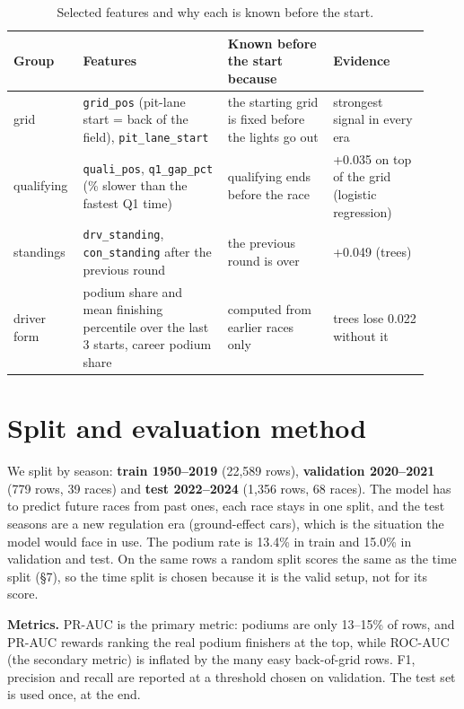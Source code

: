\documentclass[10pt,a4paper]{article}
\newcommand{\code}[1]{\texttt{#1}}
\begin{document}
\begin{table}[H]
\centering\small
\caption{Selected features and why each is known before the start.}
\begin{tabular}{>{\raggedright\arraybackslash}p{0.13\linewidth}>{\raggedright\arraybackslash}p{0.33\linewidth}>{\raggedright\arraybackslash}p{0.24\linewidth}>{\raggedright\arraybackslash}p{0.22\linewidth}}
\toprule
Group & Features & Known before the start because & Evidence \\
\midrule
grid & \code{grid\_pos} (pit-lane start = back of the field), \code{pit\_lane\_start} & the starting grid is fixed before the lights go out & strongest signal in every era \\
qualifying & \code{quali\_pos}, \code{q1\_gap\_pct} (\% slower than the fastest Q1 time) & qualifying ends before the race & +0.035 on top of the grid (logistic regression) \\
standings & \code{drv\_standing}, \code{con\_standing} after the previous round & the previous round is over & +0.049 (trees) \\
driver form & podium share and mean finishing percentile over the last 3 starts, career podium share & computed from earlier races only & trees lose 0.022 without it \\
\bottomrule
\end{tabular}
\end{table}

\section{Split and evaluation method}\label{sec:eval}

We split by season: \textbf{train 1950--2019} (22,589 rows), \textbf{validation 2020--2021} (779 rows, 39 races) and \textbf{test 2022--2024} (1,356 rows, 68 races). The model has to predict future races from past ones, each race stays in one split, and the test seasons are a new regulation era (ground-effect cars), which is the situation the model would face in use. The podium rate is 13.4\% in train and 15.0\% in validation and test. On the same rows a random split scores the same as the time split (\S7), so the time split is chosen because it is the valid setup, not for its score.

\textbf{Metrics.} PR-AUC is the primary metric: podiums are only 13--15\% of rows, and PR-AUC rewards ranking the real podium finishers at the top, while ROC-AUC (the secondary metric) is inflated by the many easy back-of-grid rows. F1, precision and recall are reported at a threshold chosen on validation. The test set is used once, at the end.
\end{document}
